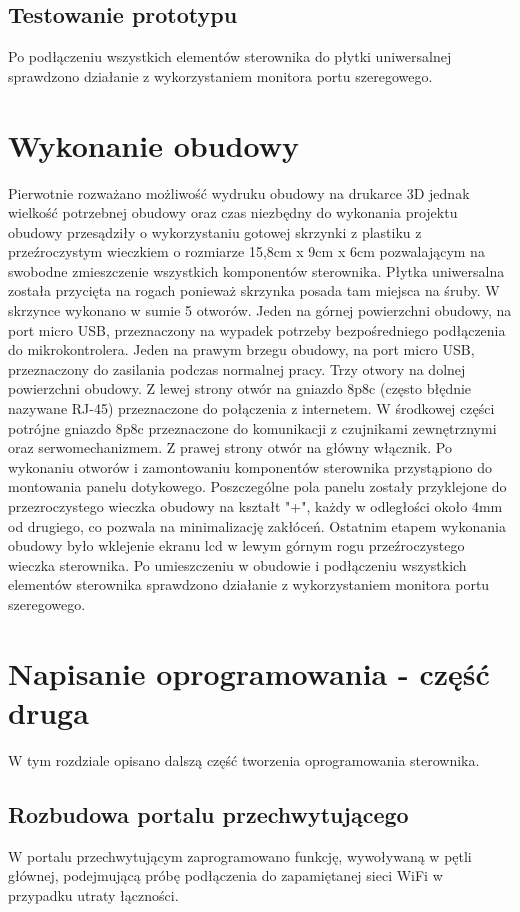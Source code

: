 \documentclass[11pt]{report}
\begin{document}
 \section{Testowanie prototypu}
 Po podłączeniu wszystkich elementów sterownika do płytki uniwersalnej sprawdzono działanie z wykorzystaniem monitora portu szeregowego.
 
 \chapter{Wykonanie obudowy}
 Pierwotnie rozważano możliwość wydruku obudowy na drukarce 3D \cite{Frence2014} jednak wielkość potrzebnej obudowy oraz czas niezbędny do wykonania projektu obudowy przesądziły o wykorzystaniu gotowej skrzynki z plastiku z przeźroczystym wieczkiem o rozmiarze 15,8cm x 9cm x 6cm pozwalającym na swobodne zmieszczenie wszystkich komponentów sterownika. Płytka uniwersalna została przycięta na rogach ponieważ skrzynka posada tam miejsca na śruby. W skrzynce wykonano w sumie 5 otworów. Jeden na górnej powierzchni obudowy, na port micro USB, przeznaczony na wypadek potrzeby bezpośredniego podłączenia do mikrokontrolera. Jeden na prawym brzegu obudowy, na port micro USB, przeznaczony do zasilania podczas normalnej pracy. Trzy otwory na dolnej powierzchni obudowy. Z lewej strony otwór na gniazdo 8p8c (często błędnie nazywane RJ-45) przeznaczone do połączenia z internetem. W środkowej części potrójne gniazdo 8p8c przeznaczone do komunikacji z czujnikami zewnętrznymi oraz serwomechanizmem. Z prawej strony otwór na główny włącznik.
 Po wykonaniu otworów i zamontowaniu komponentów sterownika przystąpiono do montowania panelu dotykowego. Poszczególne pola panelu zostały przyklejone do przezroczystego wieczka obudowy na kształt "+", każdy w odległości około 4mm od drugiego, co pozwala na minimalizację zakłóceń.
 Ostatnim etapem wykonania obudowy było wklejenie ekranu lcd w lewym górnym rogu przeźroczystego wieczka sterownika.
 Po umieszczeniu w obudowie i podłączeniu wszystkich elementów sterownika sprawdzono działanie z wykorzystaniem monitora portu szeregowego.
 
 \chapter{Napisanie oprogramowania - część druga}\label{prog:2}
 W tym rozdziale opisano dalszą część tworzenia oprogramowania sterownika. 

  \section{Rozbudowa portalu przechwytującego}
  W portalu przechwytującym zaprogramowano funkcję, wywoływaną w pętli głównej, podejmującą próbę podłączenia do zapamiętanej sieci WiFi w przypadku utraty łączności.
  
\end{document}
